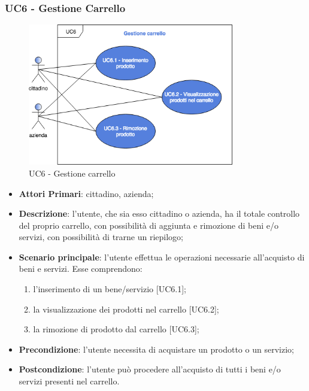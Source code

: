 \subsubsection{UC6 - Gestione Carrello}
 \begin{figure}[h]
	\includegraphics[width=9cm]{res/images/UC6GestioneCarrello.png}
	\centering
	\caption{UC6 - Gestione carrello}
\end{figure}
\begin{itemize}
	\item \textbf{Attori Primari}: cittadino, azienda\glo;
	\item \textbf{Descrizione}: l'utente, che sia esso cittadino o azienda, ha il totale controllo del proprio carrello, con possibilità di aggiunta e rimozione di beni e/o servizi, con possibilità di trarne un riepilogo;
	\item \textbf{Scenario principale}: l'utente effettua le operazioni necessarie all'acquisto di beni e servizi. Esse comprendono:
	\begin{enumerate}[label=\alph*.]
		\item l'inserimento di un bene/servizio [UC6.1];
		\item la visualizzazione dei prodotti nel carrello [UC6.2];
		\item la rimozione di prodotto dal carrello [UC6.3];
	\end{enumerate}
	\item \textbf{Precondizione}: l'utente necessita di acquistare un prodotto o un servizio;
	\item \textbf{Postcondizione}: l'utente può procedere all'acquisto di tutti i beni e/o servizi presenti nel carrello.
\end{itemize} 

